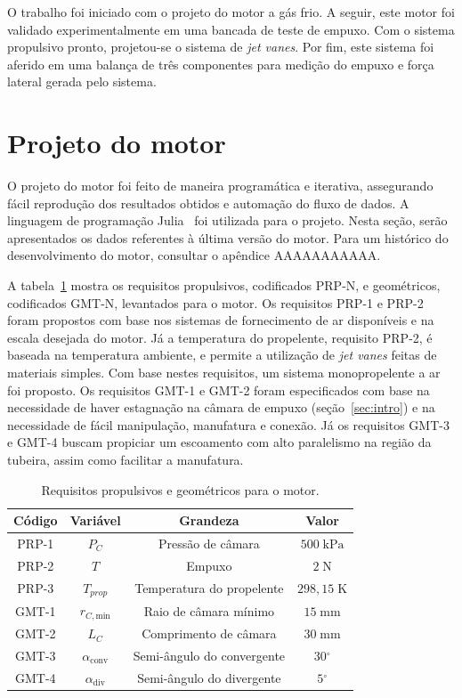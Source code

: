 
O trabalho foi iniciado com o projeto do motor a gás frio. A seguir, este motor foi validado experimentalmente em uma bancada de teste de empuxo. Com o sistema propulsivo pronto, projetou-se o sistema de \textit{jet vanes}. Por fim, este sistema foi aferido em uma balança de três componentes para medição do empuxo e força lateral gerada pelo sistema. 

\section{Projeto do motor}\label{sec:motor_project}

O projeto do motor foi feito de maneira programática e iterativa, assegurando fácil reprodução dos resultados obtidos e automação do fluxo de dados. A linguagem de programação Julia~\cite{Julia-2017} foi utilizada para o projeto. Nesta seção, serão apresentados os dados referentes à última versão do motor. Para um histórico do desenvolvimento do motor, consultar o apêndice AAAAAAAAAAA\@.  

A tabela~\ref{tab:requirements} mostra os requisitos propulsivos, codificados PRP-N, e geométricos, codificados GMT-N, levantados para o motor. Os requisitos PRP-1 e PRP-2 foram propostos com base nos sistemas de fornecimento de ar disponíveis e na escala desejada do motor. Já a temperatura do propelente, requisito PRP-2, é baseada na temperatura ambiente, e permite a utilização de \textit{jet vanes} feitas de materiais simples. Com base nestes requisitos, um sistema monopropelente a ar foi proposto. Os requisitos GMT-1 e GMT-2 foram especificados com base na necessidade de haver estagnação na câmara de empuxo (seção~\ref{sec:intro}) e na necessidade de fácil manipulação, manufatura e conexão. Já os requisitos GMT-3 e GMT-4 buscam propiciar um escoamento com alto paralelismo na região da tubeira, assim como facilitar a manufatura.

\begin{table}[htpb]
    \centering\begin{tabular}{cccc} \toprule
        Código & Variável & Grandeza & Valor \\ \midrule
        PRP-1 & \(P_C\) & Pressão de câmara & \(500\;\mathrm{kPa}\) \\
        PRP-2 & \(T\) & Empuxo & \(2\;\mathrm{N}\) \\
        PRP-3 &\(T_{prop}\) & Temperatura do propelente & \(298,15\;\mathrm{K}\) \\
        GMT-1 & \(r_{C,\text{min}}\) & Raio de câmara mínimo & \(15\;\mathrm{mm}\) \\
        GMT-2 & \(L_C\) & Comprimento de câmara & \(30\;\mathrm{mm}\) \\
        GMT-3 & \(\alpha_{\text{conv}}\) & Semi-ângulo do convergente & \(30\mathrm{^\circ} \) \\
        GMT-4 & \(\alpha_{\text{div}}\) & Semi-ângulo do divergente & \(5\mathrm{^\circ} \) \\ \bottomrule 
    \end{tabular}
    \caption{Requisitos propulsivos e geométricos para o motor.}\label{tab:requirements}
\end{table}

